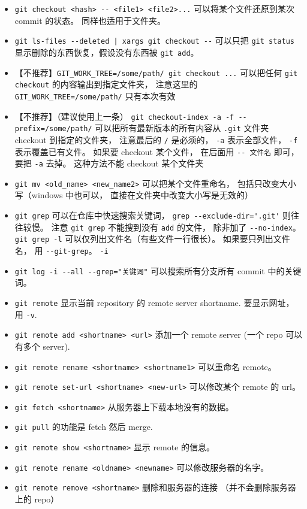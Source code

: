 \begin{itemize}
\item \verb`git checkout <hash> -- <file1> <file2>...` 可以将某个文件还原到某次 commit 的状态。 同样也适用于文件夹。
\item \verb`git ls-files --deleted | xargs git checkout --` 可以只把 \verb`git status` 显示删除的东西恢复，假设没有东西被 \verb`git add`。
\item 【不推荐】\verb`GIT_WORK_TREE=/some/path/ git checkout ...` 可以把任何 \verb`git checkout` 的内容输出到指定文件夹， 注意这里的 \verb`GIT_WORK_TREE=/some/path/` 只有本次有效
\item 【不推荐】（建议使用上一条） \verb`git checkout-index -a -f --prefix=/some/path/` 可以把所有最新版本的所有内容从 \verb`.git` 文件夹 checkout 到指定的文件夹， 注意最后的 \verb`/` 是必须的， \verb`-a` 表示全部文件， \verb`-f` 表示覆盖已有文件。 如果要 checkout 某个文件， 在后面用 \verb`-- 文件名` 即可， 要把 \verb`-a` 去掉。 这种方法不能 checkout 某个文件夹
\item \verb`git mv <old_name> <new_name2>` 可以把某个文件重命名， 包括只改变大小写（windows 中也可以， 直接在文件夹中改变大小写是无效的）
\item \verb`git grep` 可以在仓库中快速搜索关键词， \verb`grep --exclude-dir='.git'` 则往往较慢。 注意 \verb`git grep` 不能搜到没有 \verb`add` 的文件， 除非加了 \verb`--no-index`。 \verb`git grep -l` 可以仅列出文件名（有些文件一行很长）。 如果要只列出文件名， 用 \verb`--git-grep`。 \verb`-i`
\item \verb`git log -i --all --grep="关键词"` 可以搜索所有分支所有 commit 中的关键词。
\item \verb`git remote` 显示当前 repository 的 remote server shortname. 要显示网址， 用 \verb`-v`.
\item \verb`git remote add <shortname> <url>` 添加一个 remote server (一个 repo 可以有多个 server).
\item \verb`git remote rename <shortname> <shortname1>` 可以重命名 remote。
\item \verb`git remote set-url <shortname> <new-url>` 可以修改某个 remote 的 url。
\item \verb`git fetch <shortname>` 从服务器上下载本地没有的数据。
\item \verb`git pull` 的功能是 fetch 然后 merge.
\item \verb`git remote show <shortname>` 显示 remote 的信息。
\item \verb`git remote rename <oldname> <newname>` 可以修改服务器的名字。
\item \verb`git remote remove <shortname>` 删除和服务器的连接 （并不会删除服务器上的 repo）

\end{itemize}

